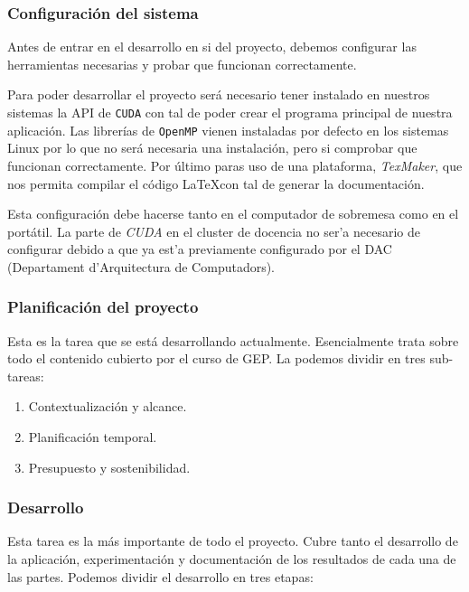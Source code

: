 \documentclass[titlepage,12pt]{report}
\begin{document}
\subsubsection{Configuración del sistema}

Antes de entrar en el desarrollo en si del proyecto, debemos configurar las herramientas necesarias y probar que funcionan correctamente.

Para poder desarrollar el proyecto será necesario tener instalado en nuestros sistemas la API de \texttt{CUDA} con tal de poder crear el programa principal de nuestra aplicación. Las librerías de \texttt{OpenMP} vienen instaladas por defecto en los sistemas Linux por lo que no será necesaria una instalación, pero si comprobar que funcionan correctamente. Por último paras uso de una plataforma, \textit{TexMaker}, que nos permita compilar el código \LaTeX con tal de generar la documentación.

Esta configuración debe hacerse tanto en el computador de sobremesa como en el portátil. La parte de \textit{CUDA} en el cluster de docencia no ser'a necesario de configurar debido a que ya est'a previamente configurado por el DAC (Departament d'Arquitectura de Computadors). 

\subsubsection{Planificación del proyecto}

Esta es la tarea que se está desarrollando actualmente. Esencialmente trata sobre todo el contenido cubierto por el curso de GEP. La podemos dividir en tres sub-tareas:

\begin{enumerate}
		\item Contextualización y alcance.
		\item Planificación temporal.
		\item Presupuesto y sostenibilidad.
\end{enumerate}

\subsubsection{Desarrollo}

Esta tarea es la más importante de todo el proyecto. Cubre tanto el desarrollo de la aplicación, experimentación y documentación de los resultados de cada una de las partes.
Podemos dividir el desarrollo en tres etapas: 
\end{document}
